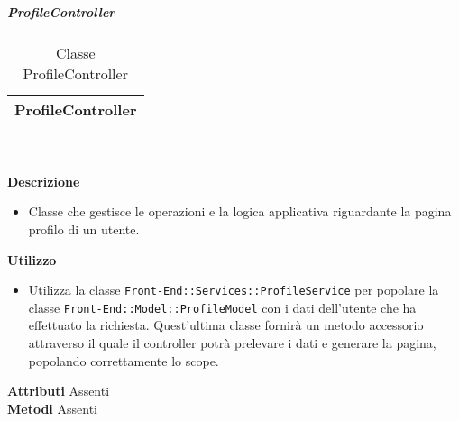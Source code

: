 			\subparagraph{ProfileController} 
\begin{table}[ht]
\begin{center}
\bgroup
	\setlength{\arrayrulewidth}{0.6mm}
	\def\arraystretch{1}
		\begin{tabular}{ | p{12cm} | }
				\hline  
					\centerline{\textbf{ProfileController}}
		\\ \hline 
				\hline
				\hline
		
		\end{tabular}
\egroup
\caption{Classe ProfileController}
\end{center}
\end{table} \textbf{\\ \\ Descrizione}
\begin{itemize}
\item[] Classe che gestisce le operazioni e la logica applicativa riguardante la pagina profilo di un utente.
\end{itemize} 
\textbf{Utilizzo}
\begin{itemize}
\item[] Utilizza la classe \texttt{Front-End::Services::ProfileService} per popolare la classe \texttt{Front-End::Model::ProfileModel} con i dati dell'utente che ha effettuato la richiesta. Quest'ultima classe fornirà un metodo accessorio attraverso il quale il controller potrà prelevare i dati e generare la pagina, popolando correttamente lo scope.
\end{itemize}
\textbf{Attributi}
Assenti \\
\textbf{Metodi}
Assenti \\

